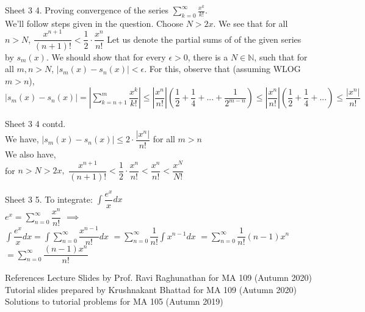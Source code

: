 \documentclass[aspectratio=169]{beamer}
\begin{document}
\begin{frame}{Sheet 3}
    4. Proving convergence of the series $\displaystyle \sum_{k=0}^{\infty} \frac{x^k}{k!}$. \\
    \medskip
    We'll follow steps given in the question.
    Choose $N>2x$. 
    \medskip
    We see that for all $n>N$,  \hspace{10pt}
    $\dfrac{x^{n+1}}{(n+1)!} < \dfrac{1}{2}\cdot\dfrac{x^n}{n!}$
    Let us denote the partial sums of of the given series by $s_m(x)$. 
    We should show that for every $\epsilon>0$, there is a $N \in \mathbb{N}$, such that for all $m, n > N $, $|s_m(x)-s_n(x)|<\epsilon$.
    \medskip
    For this, observe that (assuming WLOG $m>n$), 
    $ \displaystyle  |s_m(x)-s_n(x)| = \left|\sum_{k=n+1}^{m} \dfrac{x^k}{k!}\right| \leq \left|\dfrac{x^n}{n!}\right|\left(\dfrac{1}{2} +\dfrac{1}{4} + ... + \dfrac{1}{2^{m-n}} \right) \leq \left|\dfrac{x^n}{n!}\right|\left(\dfrac{1}{2} +\dfrac{1}{4} + ... \right) \leq \dfrac{|x^n|}{n!} $
\end{frame}

\begin{frame}{Sheet 3}
    4 contd. \\
    We have, \hspace{5pt} $ \displaystyle  |s_m(x)-s_n(x)| \leq 2 \cdot \dfrac{|x^n|}{n!} $ for all $m > n$ \\
    We also have, \\
    for $n>N>2x,$  \hspace{5pt} $\dfrac{x^{n+1}}{(n+1)!} < \dfrac{1}{2}\cdot\dfrac{x^n}{n!} < \dfrac{x^n}{n!} < \dfrac{x^N}{N!} $
\end{frame}

\begin{frame}{Sheet 3}
    5. To integrate:
    $\displaystyle \int \dfrac{e^x}{x} dx$ \\
    $e^x=\displaystyle \sum_{n=0}^{\infty} \dfrac{x^n}{n!}$  $\implies$  \\
    \smallskip
    $\displaystyle \int \dfrac{e^x}{x} dx =  \displaystyle \int \sum_{n=0}^{\infty} \dfrac{x^{n-1}}{n!}dx$
    $=\displaystyle  \sum_{n=0}^{\infty} \dfrac{1}{n!} \int x^{n-1} dx$
    $=\displaystyle  \sum_{n=0}^{\infty} \dfrac{1}{n!} (n-1)x^n$
    $=\displaystyle  \sum_{n=0}^{\infty} \dfrac{(n-1)x^n}{n!} $
\end{frame}

\begin{frame}{References}
    Lecture Slides by Prof. Ravi Raghunathan for MA 109 (Autumn 2020) \\
    Tutorial slides prepared by Krushnakant Bhattad for MA 109 (Autumn 2020) \\
    Solutions to tutorial problems for MA 105 (Autumn 2019) \\
\end{frame}
\end{document}
